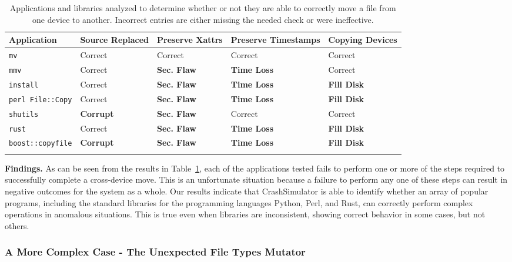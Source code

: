  \begin{table}[t]
    \scriptsize{}
    \begin{tabular}{l p{1cm} p{1cm} p{1.2cm} p{1cm}}
    \toprule{}
        Application     & Source Replaced & Preserve Xattrs & Preserve Timestamps & Copying Devices\\
\hline
        {\tt mv}              & Correct             & Correct         & Correct             & Correct\\
        {\tt mmv}             & Correct             & {\bf Sec. Flaw} & {\bf Time Loss} & Correct\\
        {\tt install}         & Correct             & {\bf Sec. Flaw} & {\bf Time Loss} & {\bf Fill Disk} \\
        {\tt perl File::Copy} & Correct             & {\bf Sec. Flaw} & {\bf Time Loss} & {\bf Fill Disk} \\
        {\tt shutils}         & {\bf Corrupt}	& {\bf Sec. Flaw} 	& Correct             & Correct\\
        {\tt rust}             & Correct             & {\bf Sec. Flaw} & {\bf Time Loss} & {\bf Fill Disk} \\
        {\tt boost::copyfile} & {\bf Corrupt}	      & {\bf Sec. Flaw} & {\bf Time Loss} & {\bf Fill Disk} \\
    \bottomrule{}
    \end{tabular}
    \caption{Applications and libraries analyzed to determine whether or not
      they are able to correctly move a file from one device to another.
Incorrect entries are either missing the needed check or were ineffective.}
    \label{table:crossdevice}
\end{table}

{\bf Findings.}
As can be seen from the results in Table~\ref{table:crossdevice}, each of the
applications tested fails to perform one or more of the steps required to
successfully complete a cross-device move.  This is an unfortunate situation
because a failure to perform any one of these steps can result in negative
outcomes for the system as a whole.
Our results indicate that CrashSimulator is able to identify whether an array of popular programs, including the standard libraries for the programming languages Python, Perl, and Rust, can correctly perform complex
operations in anomalous situations.
This is true even
when libraries are inconsistent, showing correct behavior in some cases, but not others.

\subsubsection{A More Complex Case - The Unexpected File Types Mutator}
\label{sec-file-type-bugs}

